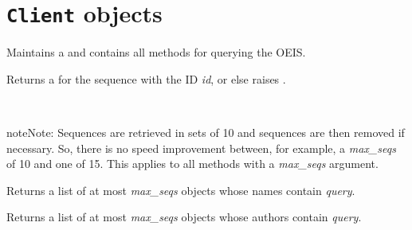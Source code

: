 \documentclass[letterpaper,10pt,english]{sphinxmanual}
\begin{document}
\section{\texttt{Client} objects}
\label{api:client-objects}

\begin{fulllineitems}
\label{api:client.OEISClient}
Maintains a \href{http://docs.python-requests.org/en/latest/api/\#requests.Session}{} and contains
all methods for querying the OEIS.

\begin{fulllineitems}
\label{api:OEISClient.get_by_id}
Returns a {\hyperref[api:sequence.Sequence]{}} for the sequence with the ID \emph{id}, or else
raises {\hyperref[api:errors.NoResultsError]{}}.

\end{fulllineitems}


\begin{fulllineitems}
\label{api:OEISClient.lookup_by_name}~
\begin{notice}{note}{Note:}
Sequences are retrieved in sets of 10 and sequences are then removed if
necessary. So, there is no speed improvement between, for example, a
\emph{max\_seqs} of 10 and one of 15. This applies to all methods with a
\emph{max\_seqs} argument.
\end{notice}

Returns a list of at most \emph{max\_seqs} {\hyperref[api:sequence.Sequence]{}}
objects whose names contain \emph{query}.

\end{fulllineitems}


\begin{fulllineitems}
\label{api:OEISClient.lookup_by_author}
Returns a list of at most \emph{max\_seqs} {\hyperref[api:sequence.Sequence]{}}
objects whose authors contain \emph{query}.


\end{fulllineitems}
\end{fulllineitems}
\end{document}
